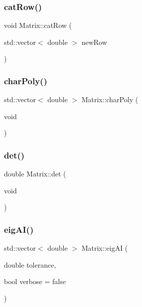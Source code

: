 \subsubsection{\texorpdfstring{cat\+Row()}{catRow()}}
{\footnotesize\ttfamily void Matrix\+::cat\+Row (\begin{DoxyParamCaption}\item[{std\+::vector$<$ double $>$}]{new\+Row }\end{DoxyParamCaption})}

\mbox{\label{class_matrix_ac702d7055ec8bd0d804af3025b51cdec}} 
\subsubsection{\texorpdfstring{char\+Poly()}{charPoly()}}
{\footnotesize\ttfamily std\+::vector$<$ double $>$ Matrix\+::char\+Poly (\begin{DoxyParamCaption}\item[{void}]{ }\end{DoxyParamCaption})}

\mbox{\label{class_matrix_a8229fbecb4ec1119be6c210186ecb95c}} 
\subsubsection{\texorpdfstring{det()}{det()}}
{\footnotesize\ttfamily double Matrix\+::det (\begin{DoxyParamCaption}\item[{void}]{ }\end{DoxyParamCaption})}

\mbox{\label{class_matrix_a107beca4305d735f074f6cb6ef97dbc9}} 
\subsubsection{\texorpdfstring{eig\+A\+I()}{eigAI()}}
{\footnotesize\ttfamily std\+::vector$<$ double $>$ Matrix\+::eig\+AI (\begin{DoxyParamCaption}\item[{double}]{tolerance,  }\item[{bool}]{verbose = {\ttfamily false} }\end{DoxyParamCaption})}

